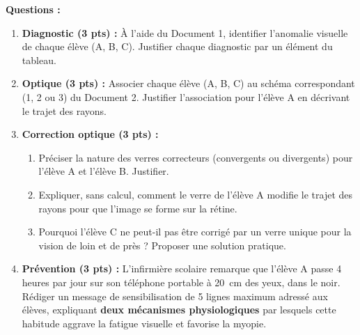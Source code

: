 \documentclass[11pt]{article}
\begin{document}
\begin{exercice}
\textbf{Questions :}
\begin{enumerate}
\item \textbf{Diagnostic (3 pts) :} À l'aide du Document 1, identifier l'anomalie visuelle de chaque élève (A, B, C). Justifier chaque diagnostic par un élément du tableau.
\item \textbf{Optique (3 pts) :} Associer chaque élève (A, B, C) au schéma correspondant (1, 2 ou 3) du Document 2. Justifier l'association pour l'élève A en décrivant le trajet des rayons.
\item \textbf{Correction optique (3 pts) :}
\begin{enumerate}
\item Préciser la nature des verres correcteurs (convergents ou divergents) pour l'élève A et l'élève B. Justifier.
\item Expliquer, sans calcul, comment le verre de l'élève A modifie le trajet des rayons pour que l'image se forme sur la rétine.
\item Pourquoi l'élève C ne peut-il pas être corrigé par un verre unique pour la vision de loin et de près ? Proposer une solution pratique.
\end{enumerate}
\item \textbf{Prévention (3 pts) :} L'infirmière scolaire remarque que l'élève A passe 4 heures par jour sur son téléphone portable à \SI{20}{cm} des yeux, dans le noir. Rédiger un message de sensibilisation de 5 lignes maximum adressé aux élèves, expliquant \textbf{deux mécanismes physiologiques} par lesquels cette habitude aggrave la fatigue visuelle et favorise la myopie.
\end{enumerate}
\end{exercice}
\end{document}
